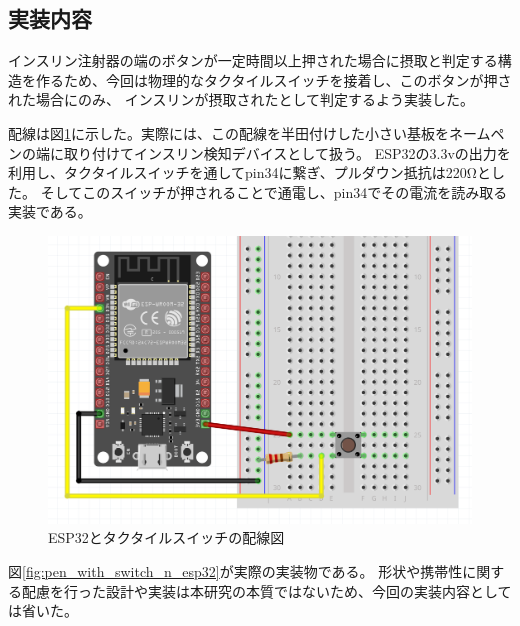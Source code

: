 \subsection{実装内容}

インスリン注射器の端のボタンが一定時間以上押された場合に摂取と判定する構造を作るため、今回は物理的なタクタイルスイッチを接着し、このボタンが押された場合にのみ、
インスリンが摂取されたとして判定するよう実装した。

配線は図\ref{fig:esp32_switch}に示した。実際には、この配線を半田付けした小さい基板をネームペンの端に取り付けてインスリン検知デバイスとして扱う。
ESP32の3.3vの出力を利用し、タクタイルスイッチを通してpin34に繋ぎ、プルダウン抵抗は220Ωとした。
そしてこのスイッチが押されることで通電し、pin34でその電流を読み取る実装である。

\begin{figure}[htbp]
  \caption{ESP32とタクタイルスイッチの配線図}
  \label{fig:esp32_switch}
  \begin{center}
    \includegraphics[bb=0 0 1000 550,width=17cm]{assets/esp32_switch.png}
  \end{center}
\end{figure}

図\ref{fig:pen_with_switch_n_esp32}が実際の実装物である。
形状や携帯性に関する配慮を行った設計や実装は本研究の本質ではないため、今回の実装内容としては省いた。

